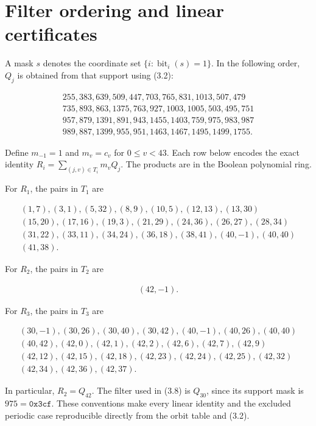 \documentclass[pdflatex,sn-mathphys-num]{sn-jnl}
\begin{document}
\section{Filter ordering and linear certificates}\label{app:B}

A mask $s$ denotes the coordinate set $\{i: \operatorname{bit}_i(s)=1\}$. In the following order, $Q_j$ is obtained from that support using (3.2):

\[
\begin{gathered}
255,383,639,509,447,703,765,831,1013,507,479 \\
735,893,863,1375,763,927,1003,1005,503,495,751 \\
957,879,1391,891,943,1455,1403,759,975,983,987 \\
989,887,1399,955,951,1463,1467,1495,1499,1755.
\end{gathered}
\]

Define $m_{-1}=1$ and $m_v=c_v$ for $0\le v<43$. Each row below encodes the exact identity $R_i=\sum_{(j,v)\in T_i}m_vQ_j$. The products are in the Boolean polynomial ring.

For $R_1$, the pairs in $T_1$ are

\[
\begin{gathered}
(1,7),(3,1),(5,32),(8,9),(10,5),(12,13),(13,30) \\
(15,20),(17,16),(19,3),(21,29),(24,36),(26,27),(28,34) \\
(31,22),(33,11),(34,24),(36,18),(38,41),(40,-1),(40,40) \\
(41,38).
\end{gathered}
\]

For $R_2$, the pairs in $T_2$ are

\[
\begin{gathered}
(42,-1).
\end{gathered}
\]

For $R_3$, the pairs in $T_3$ are

\[
\begin{gathered}
(30,-1),(30,26),(30,40),(30,42),(40,-1),(40,26),(40,40) \\
(40,42),(42,0),(42,1),(42,2),(42,6),(42,7),(42,9) \\
(42,12),(42,15),(42,18),(42,23),(42,24),(42,25),(42,32) \\
(42,34),(42,36),(42,37).
\end{gathered}
\]

In particular, $R_2=Q_{42}$. The filter used in (3.8) is $Q_{30}$, since its support mask is $975=\mathtt{0x3cf}$. These conventions make every linear identity and the excluded periodic case reproducible directly from the orbit table and (3.2).
\end{document}
